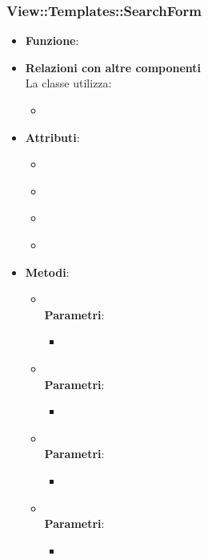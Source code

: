 \subsubsection{View::Templates::SearchForm}
\begin{itemize}
\item\textbf{Funzione}:
\item\textbf{Relazioni con altre componenti}\\
La classe utilizza:
	\begin{itemize}
		\item
	\end{itemize}
\item\textbf{Attributi}:
	\begin{itemize}
		\item\code{}\\
		\item\code{}\\
		\item\code{}\\
		\item\code{}\\
	\end{itemize}
\item\textbf{Metodi}:
	\begin{itemize}
		\item\code{}\\
		\textbf{Parametri}:
			\begin{itemize}
				\item\code{}\\
			\end{itemize}
		\item\code{}\\
		\textbf{Parametri}:
			\begin{itemize}
				\item\code{}\\
			\end{itemize}
		\item\code{}\\
		\textbf{Parametri}:
			\begin{itemize}
				\item\code{}\\
			\end{itemize}
		\item\code{}\\
		\textbf{Parametri}:
			\begin{itemize}
				\item\code{}\\
			\end{itemize}
	\end{itemize}
\end{itemize}